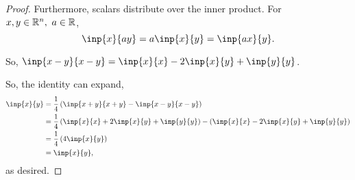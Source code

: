 \documentclass[..hw1]{subfiles}
\begin{document}
\begin{problem}
\begin{enumerate}[label=\alph*)]
\begin{proof}
		      Furthermore, scalars distribute over the inner product. For $x,y\in \mathbb{R}^{n},\ a\in \mathbb{R}$, \[
			      \inp{x}{ay} = a\inp{x}{y} = \inp{ax}{y}
			      .\]

		      So, $\inp{x-y}{x-y} = \inp{x}{x} - 2\inp{x}{y} + \inp{y}{y}$.

		      So, the identity can expand,
		      \begin{align*}
			      \inp{x}{y} & =\frac{1}{4}\left( \inp{x+y}{x+y}-\inp{x-y}{x-y} \right)                                                              \\
			                 & = \frac{1}{4} \left( \inp{x}{x}+2\inp{x}{y}+\inp{y}{y} \right) - \left( \inp{x}{x} - 2\inp{x}{y} + \inp{y}{y} \right) \\
			                 & = \frac{1}{4}\left( 4\inp{x}{y} \right)                                                                               \\
			                 & = \inp{x}{y},                                                                                                         \\
		      \end{align*}
		      as desired.
	      \end{proof}

\end{enumerate}
\end{problem}
\end{document}
